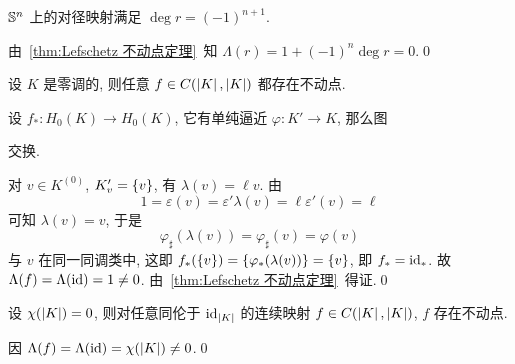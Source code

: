 \begin{Corollary}
	$ \S^n $ 上的对径映射满足 $ \deg r=(-1)^{n+1} $.
\end{Corollary}
\begin{Proof}
	由~\ref{thm:Lefschetz 不动点定理}~知 $ \Lambda(r)=1+(-1)^n\deg r=0 $.\qed
\end{Proof}

\begin{Corollary}
	设 $ K $ 是零调的, 则任意 $ f\in C(\abs{K},\abs{K}) $ 都存在不动点.
\end{Corollary}
\begin{Proof}
	设 $ f_* : H_0(K)\to H_0(K) $, 它有单纯逼近 $ \varphi : K'\to K $, 那么图
	\begin{center}
	\end{center}
	交换.

	对 $ v\in K^{(0)} $, $ K_v'=\set{v} $, 有 $ \lambda(v)=\ell v $. 由
	\[
		1=\varepsilon(v)=\varepsilon'\lambda(v)=\ell\varepsilon'(v)=\ell
	\]
	可知 $ \lambda(v)=v $, 于是
	\[
		\varphi_\sharp(\lambda(v))=\varphi_\sharp(v)=\varphi(v)
	\]
	与 $ v $ 在同一同调类中, 这即 $ f_*(\set{v})=\set{\varphi_*(\lambda(v))}=\set{v} $, 即 $ f_*=\id_* $. 故 $ \Lambda(f)=\Lambda(\id)=1\ne 0 $. 由~\ref{thm:Lefschetz 不动点定理}~得证.\qed
\end{Proof}

\begin{Corollary}
	设 $ \chi(\abs{K})=0 $, 则对任意同伦于 $ \id_{\abs{K}} $ 的连续映射 $ f\in C(\abs{K},\abs{K}) $, $ f $ 存在不动点.
\end{Corollary}
\begin{Proof}
	因 $ \Lambda(f)=\Lambda(\id)=\chi(\abs{K})\ne 0 $.\qed
\end{Proof}